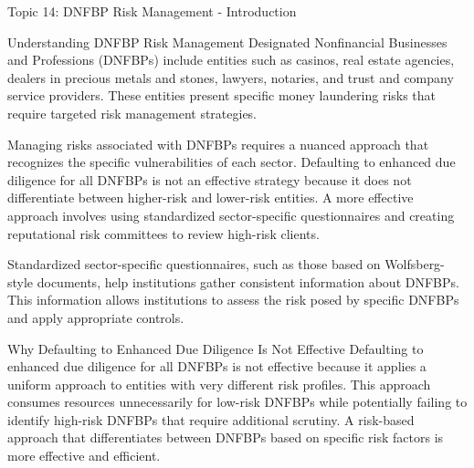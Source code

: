 \documentclass[8pt]{beamer}  %
\begin{document}
	\begin{frame}{Topic 14: DNFBP Risk Management - Introduction}
		\begin{block}{\large Understanding DNFBP Risk Management}
			Designated Nonfinancial Businesses and Professions (DNFBPs) include entities such as casinos, real estate agencies, dealers in precious metals and stones, lawyers, notaries, and trust and company service providers. These entities present specific money laundering risks that require targeted risk management strategies.
			
			Managing risks associated with DNFBPs requires a nuanced approach that recognizes the specific vulnerabilities of each sector. Defaulting to enhanced due diligence for all DNFBPs is not an effective strategy because it does not differentiate between higher-risk and lower-risk entities. A more effective approach involves using standardized sector-specific questionnaires and creating reputational risk committees to review high-risk clients.
			
			Standardized sector-specific questionnaires, such as those based on Wolfsberg-style documents, help institutions gather consistent information about DNFBPs. This information allows institutions to assess the risk posed by specific DNFBPs and apply appropriate controls.
		\end{block}
		
		\vspace{0.2cm}
		\begin{block}{\large Why Defaulting to Enhanced Due Diligence Is Not Effective}
			Defaulting to enhanced due diligence for all DNFBPs is not effective because it applies a uniform approach to entities with very different risk profiles. This approach consumes resources unnecessarily for low-risk DNFBPs while potentially failing to identify high-risk DNFBPs that require additional scrutiny. A risk-based approach that differentiates between DNFBPs based on specific risk factors is more effective and efficient.
		\end{block}
	\end{frame}
	
\end{document}
